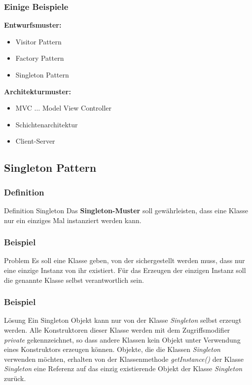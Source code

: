 \documentclass[class=beamer, crop=false]{standalone}
\begin{document}
\begin{frame}
\frametitle{Einige Beispiele}
	\textbf{Entwurfsmuster:} 
	\begin{itemize}
		\item Visitor Pattern
		\item Factory Pattern
		\item Singleton Pattern
	\end{itemize}
	\vspace{0.3cm}
	\textbf{Architekturmuster:} 
	\begin{itemize}
		\item MVC $\ldots$ Model View Controller
		\item Schichtenarchitektur
		\item Client-Server
	\end{itemize}
\end{frame}

\subsection{Singleton Pattern}

\begin{frame}
\frametitle{Definition}
\begin{block}{Definition Singleton}
	Das \textbf{Singleton-Muster} soll gewährleisten, dass eine Klasse nur ein einziges Mal instanziert werden kann. \cite{architektur}
\end{block}

\end{frame}

\begin{frame}
	\frametitle{Beispiel}
\begin{alertblock}{Problem}
	Es soll eine Klasse geben, von der sichergestellt werden muss, dass nur eine einzige Instanz von ihr existiert. Für das Erzeugen der einzigen Instanz soll die genannte Klasse selbst verantwortlich sein. \cite{architektur}
\end{alertblock}
\end{frame}

\begin{frame}
	\frametitle{Beispiel}
\begin{exampleblock}{Lösung}
	Ein Singleton Objekt kann nur von der Klasse \textit{Singleton} selbst erzeugt werden. Alle Konstruktoren dieser Klasse werden mit dem Zugriffsmodifier \textit{private} gekennzeichnet, so dass andere Klassen kein Objekt unter Verwendung eines Konstruktors erzeugen können. Objekte, die die Klassen \textit{Singleton} verwenden möchten, erhalten von der Klassenmethode \textit{getInstance()} der Klasse \textit{Singleton} eine Referenz auf das einzig existierende Objekt der Klasse \textit{Singleton} zurück. \cite{architektur}
\end{exampleblock}
\end{frame}
\end{document}
